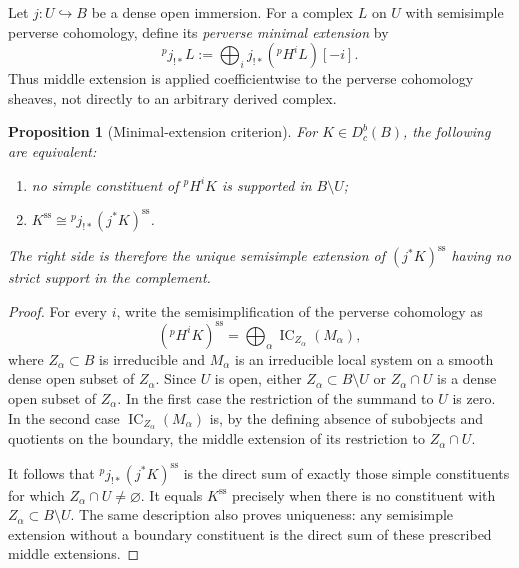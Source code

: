 \documentclass[11pt,reqno]{amsart}
\newtheorem{proposition}[theorem]{Proposition}
\theoremstyle{definition}
\newcommand{\IC}{\operatorname{IC}}
\begin{document}
Let $j:U\hookrightarrow B$ be a dense open immersion.  For a complex $L$ on
$U$ with semisimple perverse cohomology, define its \emph{perverse minimal
extension} by
\begin{equation}\label{eq:perverse-minimal-extension}
  {}^pj_{!*}L:=\bigoplus_i j_{!*}({}^pH^iL)[-i].
\end{equation}
Thus middle extension is applied coefficientwise to the perverse cohomology
sheaves, not directly to an arbitrary derived complex.

\begin{proposition}[Minimal-extension criterion]
\label{prop:minimal-extension-criterion}
For $K\in D_c^b(B)$, the following are equivalent:

\begin{enumerate}[label=$\roman*$,leftmargin=8mm]
\item no simple constituent of ${}^pH^iK$ is supported in $B\setminus U$;
\item $K^{\mathrm{ss}}\cong{}^pj_{!*}(j^*K)^{\mathrm{ss}}$.
\end{enumerate}

The right side is therefore the unique semisimple extension of
$(j^*K)^{\mathrm{ss}}$ having no strict support in the complement.
\end{proposition}

\begin{proof}
For every $i$, write the semisimplification of the perverse cohomology as
\[
 ({}^pH^iK)^{\mathrm{ss}}
 =\bigoplus_{\alpha}\IC_{Z_\alpha}(M_\alpha),
\]
where $Z_\alpha\subset B$ is irreducible and $M_\alpha$ is an irreducible
local system on a smooth dense open subset of $Z_\alpha$.  Since $U$ is
open, either $Z_\alpha\subset B\setminus U$ or $Z_\alpha\cap U$ is a dense
open subset of $Z_\alpha$.  In the first case the restriction of the
summand to $U$ is zero.  In the second case
$\IC_{Z_\alpha}(M_\alpha)$ is, by the defining absence of subobjects and
quotients on the boundary, the middle extension of its restriction to
$Z_\alpha\cap U$.

It follows that ${}^pj_{!*}(j^*K)^{\mathrm{ss}}$ is the direct sum of
exactly those simple constituents for which $Z_\alpha\cap U\ne\varnothing$.
It equals $K^{\mathrm{ss}}$ precisely when there is no constituent with
$Z_\alpha\subset B\setminus U$.  The same description also proves
uniqueness: any semisimple extension without a boundary constituent is the
direct sum of these prescribed middle extensions.
\end{proof}
\end{document}
